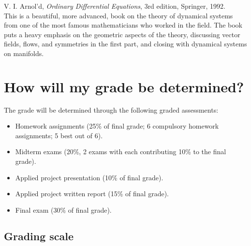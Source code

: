 \documentclass[11pt]{article}
\newcommand{\push}{\hangpara{2em}{1}}
\begin{document}
\push V. I. Arnol’d, \textit{Ordinary Differential Equations}, 3rd edition, Springer, 1992. \\
This is a beautiful, more advanced, book on the theory of dynamical systems from one of the most famous mathematicians who worked in the field. The book puts a heavy emphasis on the geometric aspects of the theory, discussing vector fields, flows, and symmetries in the first part, and closing with dynamical systems on manifolds.


\section{How will my grade be determined?}

The grade will be determined through the following graded assessments:

\begin{itemize}[label={-},noitemsep]
  \item Homework assignments (25\% of final grade; 6 compulsory homework assignments; 5 best out of 6). 
  \item Midterm exams (20\%, 2 exams with each contributing 10\% to the final grade).
  \item Applied project presentation (10\% of final grade).
  \item Applied project written report (15\% of final grade).
  \item Final exam (30\% of final grade).
\end{itemize}

\subsection{Grading scale}

\end{document}
